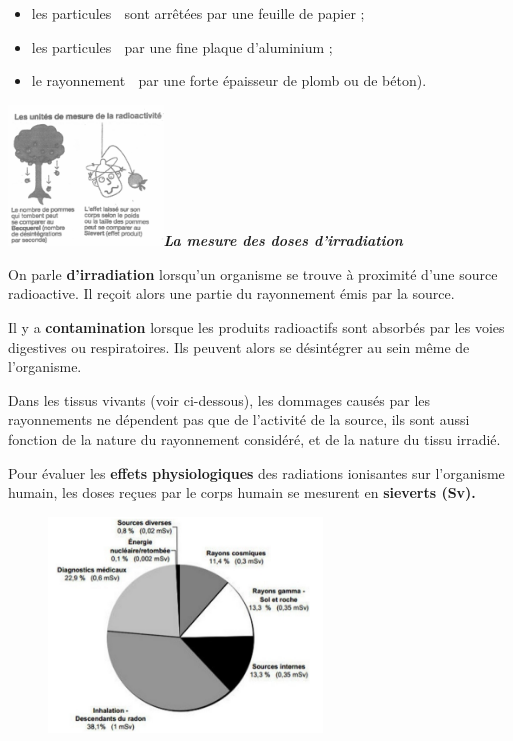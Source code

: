 \begin{itemize}
\tightlist
\item
  les particules  sont arrêtées par une feuille de papier ;
\item
  les particules  par une fine plaque d'aluminium ;
\item
  le rayonnement  par une forte épaisseur de plomb ou de béton).
\end{itemize}

\includegraphics[width=4.115cm,height=3.741cm]{Pictures/100000010000018600000162E2F7BB9DEC874BD7.png}\emph{\textbf{La
mesure des doses d'irradiation}}

On parle \textbf{d'irradiation} lorsqu'un organisme se trouve à
proximité d'une source radioactive. Il reçoit alors une partie du
rayonnement émis par la source.

Il y a \textbf{contamination }lorsque les produits radioactifs sont
absorbés par les voies digestives ou respiratoires. Ils peuvent alors se
désintégrer au sein même de l'organisme.

Dans les tissus vivants (voir ci-dessous), les dommages causés par les
rayonnements ne dépendent pas que de l'activité de la source, ils sont
aussi fonction de la nature du rayonnement considéré, et de la nature du
tissu irradié.

Pour évaluer les \textbf{effets physiologiques} des radiations
ionisantes sur l'organisme humain, les doses reçues par le corps humain
se mesurent en \textbf{sieverts (Sv). }

\begin{figure}
\centering
\includegraphics[width=7.28cm,height=5.726cm]{Pictures/100000010000027A000001F28EDBC323318C37DA.png}
\caption{}
\end{figure}

